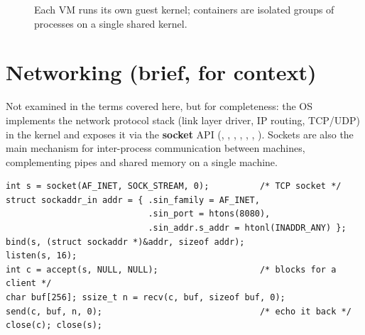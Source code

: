 \begin{figure}[H]
\centering
{}
\caption{Each VM runs its own guest kernel; containers are isolated groups
of processes on a single shared kernel.}
\end{figure}

\section{Networking (brief, for context)}
Not examined in the terms covered here, but for completeness: the OS implements the network
protocol stack (link layer driver, IP routing, TCP/UDP) in the kernel and exposes it via the
\textbf{socket} API (, , , , ,
, ). Sockets are also the main mechanism for inter-process communication
between machines, complementing pipes and shared memory on a single machine.

\begin{lstlisting}[style=c]
int s = socket(AF_INET, SOCK_STREAM, 0);          /* TCP socket */
struct sockaddr_in addr = { .sin_family = AF_INET,
                            .sin_port = htons(8080),
                            .sin_addr.s_addr = htonl(INADDR_ANY) };
bind(s, (struct sockaddr *)&addr, sizeof addr);
listen(s, 16);
int c = accept(s, NULL, NULL);                    /* blocks for a client */
char buf[256]; ssize_t n = recv(c, buf, sizeof buf, 0);
send(c, buf, n, 0);                               /* echo it back */
close(c); close(s);
\end{lstlisting}

